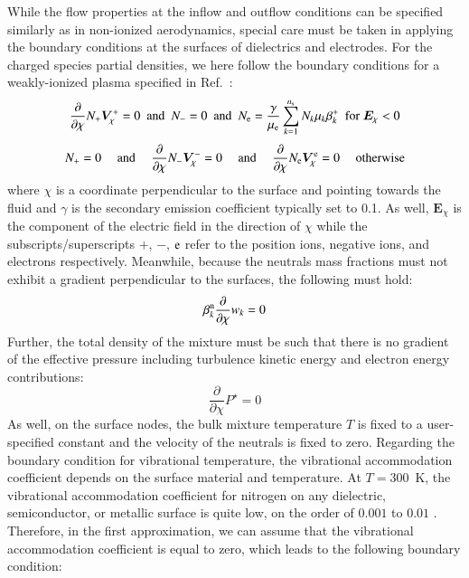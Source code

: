 \documentclass{warpdoc}
\newcommand{\ns}{{n_{\rm s}}}
\renewcommand{\vec}[1]{\bm{#1}}
\begin{document}
While the flow properties at the inflow and outflow conditions can be specified similarly as in non-ionized aerodynamics, special care must be taken in applying the boundary conditions at the surfaces of dielectrics and electrodes. For the charged species partial densities, we here follow the boundary conditions for a weakly-ionized plasma specified in Ref.\ \cite{jcp:2014:parent}:
%
\begin{equation}
\frac{\partial }{\partial \chi} N_+ \vec{V}^{+}_\chi = 0
{~~\rm and~~}
N_{-}=0
{~~\rm and~~}
N_{\rm e}=\frac{\gamma}{\mu_{\rm e}} \sum_{k=1}^\ns N_k \mu_k \beta_k^+
{~~\rm for~}
\vec{E}_\chi<0
\end{equation}
%
%
\begin{equation}
N_{+}=0
{~~~~~\rm and~~~~~}
\frac{\partial }{\partial \chi} N_- \vec{V}^{-}_\chi = 0
{~~~~~\rm and~~~~~}
\frac{\partial }{\partial \chi} N_{\rm e} \vec{V}^{\rm e}_\chi= 0
{~~~~~\rm otherwise} 
\end{equation}
%
where $\chi$ is a coordinate perpendicular to the surface and pointing towards the fluid and $\gamma$ is the secondary emission coefficient typically set to 0.1. As well, $\vec{E}_\chi$ is the component of the electric field in the direction of $\chi$ while the subscripts/superscripts $+$, $-$, $\rm e$ refer to the position ions, negative ions, and electrons respectively. Meanwhile, because the neutrals mass fractions must not exhibit a gradient perpendicular to the surfaces, the following must hold:
%
\begin{equation}
 \beta_k^{\rm n} \frac{\partial }{\partial \chi}w_{k}=0
\end{equation}
%    
Further, the total density of the mixture must be such that there is no gradient of the effective pressure including turbulence kinetic energy and electron energy contributions:
%
\begin{equation}
  \frac{\partial }{\partial \chi}P^\star=0
\end{equation}
%
As well, on the surface nodes, the bulk mixture temperature $T$ is fixed to a user-specified constant and the velocity of the neutrals is fixed to zero. Regarding the boundary condition for vibrational temperature, the vibrational accommodation coefficient depends on the surface material and temperature. At $T=300$~K, the vibrational accommodation coefficient for nitrogen on any dielectric, semiconductor, or metallic surface is quite low, on the order of $0.001$ to $0.01$ \cite{book:1977:Gershenzon,jchemp:1974:black}. Therefore, in the first approximation, we can assume that the vibrational accommodation coefficient is equal to zero, which leads to the following boundary condition:
\end{document}
